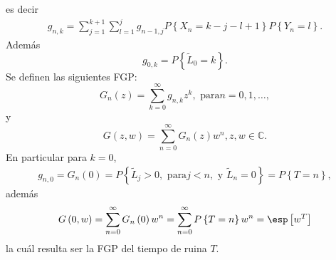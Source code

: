 es decir
\begin{eqnarray}\label{Eq.Gnk.2S}
g_{n,k}=\sum_{j=1}^{k+1}\sum_{l=1}^{j}g_{n-1,j}P\left\{X_{n}=k-j-l+1\right\}P\left\{Y_{n}=l\right\}.
\end{eqnarray}
Adem\'as
\begin{equation}\label{Eq.L02S}
g_{0,k}=P\left\{\tilde{L}_{0}=k\right\}.
\end{equation}
Se definen las siguientes FGP:
\begin{equation}\label{Eq.3.16.a.2S}
G_{n}\left(z\right)=\sum_{k=0}^{\infty}g_{n,k}z^{k},\textrm{ para
}n=0,1,\ldots,
\end{equation}
y 
\begin{equation}\label{Eq.3.16.b.2S}
G\left(z,w\right)=\sum_{n=0}^{\infty}G_{n}\left(z\right)w^{n}, z,w\in\mathbb{C}.
\end{equation}
En particular para $k=0$,
\begin{eqnarray*}
g_{n,0}=G_{n}\left(0\right)=P\left\{\tilde{L}_{j}>0,\textrm{ para
}j<n,\textrm{ y }\tilde{L}_{n}=0\right\}=P\left\{T=n\right\},
\end{eqnarray*}
adem\'as
\begin{eqnarray*}%
G\left(0,w\right)=\sum_{n=0}^{\infty}G_{n}\left(0\right)w^{n}=\sum_{n=0}^{\infty}P\left\{T=n\right\}w^{n}
=\esp\left[w^{T}\right]
\end{eqnarray*}
la cu\'al resulta ser la FGP del tiempo de ruina $T$.


